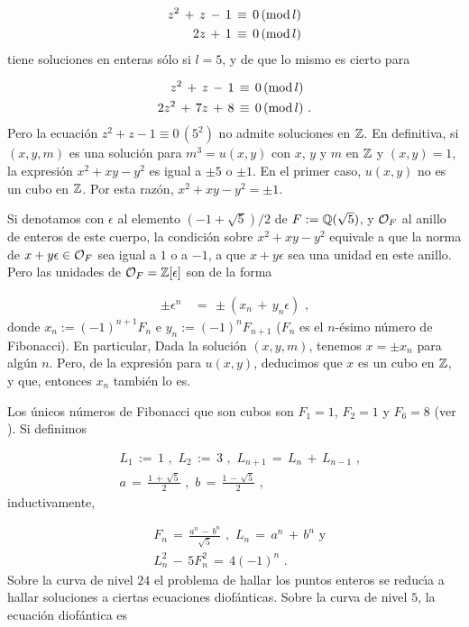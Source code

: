 \begin{align*}
z^{2}\,+\,z\,-\,1 & \,\equiv\, 0\,(\rm{mod}\,l)\\
2z\,+\,1 & \,\equiv\, 0\,(\rm{mod}\,l)
\end{align*}
tiene soluciones en enteras s\'{o}lo si $l=5$, y de que lo mismo es
cierto para

\begin{align*}
z^{2}\,+\,z\,-\,1 & \,\equiv\, 0\,(\rm{mod}\,l)\\
2z^{2}\,+\,7z\,+\,8 & \,\equiv\, 0\,(\rm{mod}\,l)\text{ .}
\end{align*}
Pero la ecuaci\'{o}n $z^{2}+z-1\equiv 0\,(5^{2})$ no admite soluciones
en $\bb{Z}$. En definitiva, si $(x,y,m)$ es una soluci\'{o}n
para $m^{3}=u(x,y)$ con $x$, $y$ y $m$ en $\bb{Z}$ y $(x,y)=1$,
la expresi\'{o}n $x^{2}+xy-y^{2}$ es igual a $\pm 5$ o $\pm 1$. En el
primer caso, $u(x,y)$ no es un cubo en $\bb{Z}$. Por esta raz\'{o}n,
$x^{2}+xy-y^{2}=\pm 1$.

Si denotamos con $\epsilon$ al elemento $(-1+\sqrt{5})/2$ de
$F:=\bb{Q}(\sqrt{5})$, y $\cal{O}_{F}$ al anillo de enteros de este
cuerpo, la condici\'{o}n sobre $x^{2}+xy-y^{2}$ equivale a que
la norma de $x+y\epsilon\in\cal{O}_{F}$ sea igual a $1$ o a $-1$, a que
$x+y\epsilon$ sea una unidad en este anillo.
Pero las unidades de $\cal{O}_{F}=\bb{Z}[\epsilon]$ son de la forma

\begin{align*}
\pm\epsilon^{n} & \,=\,\pm(x_{n}\,+\,y_{n}\epsilon)\text{ ,}
\end{align*}
donde $x_{n}:=(-1)^{n+1}F_{n}$ e $y_{n}:=(-1)^{n}F_{n+1}$
($F_{n}$ es el $n$-\'{e}simo n\'{u}mero de Fibonacci). En particular,
Dada la soluci\'{o}n $(x,y,m)$, tenemos $x=\pm x_{n}$ para alg\'{u}n
$n$. Pero, de la expresi\'{o}n para $u(x,y)$, deducimos que $x$ es un
cubo en $\bb{Z}$, y que, entonces $x_{n}$ tambi\'{e}n lo es.

Los \'{u}nicos n\'{u}meros de Fibonacci que son cubos son $F_{1}=1$, $F_{2}=1$
y $F_{6}=8$ (ver \cite{chenLevelFive}). Si definimos

\begin{align*}
 & L_{1}\,:=\,1\text{ , }\,L_{2}\,:=\,3\text{ , }
 \,L_{n+1}\,=\,L_{n}\,+\,L_{n-1}\text{ ,}\\
 & a\,=\,\frac{1\,+\,\sqrt{5}}{2}\text{ , }
 \,b\,=\,\frac{1\,-\,\sqrt{5}}{2}\text{ ,}
\end{align*}
inductivamente,

\begin{align*}
 & F_{n}\,=\,\frac{a^{n}\,-\,b^{n}}{\sqrt{5}}\text{ , }
 \,L_{n}\,=\,a^{n}\,+\,b^{n}\text{ y}\\
 & L_{n}^{2}\,-\,5F_{n}^{2}\,=\,4(-1)^{n}\text{ .}
\end{align*}
Sobre la curva de nivel $24$ el problema de hallar los puntos enteros se
reduc\'{\i}a a hallar soluciones a ciertas ecuaciones diof\'{a}nticas. Sobre la
curva de nivel $5$, la ecuaci\'{o}n diof\'{a}ntica es

